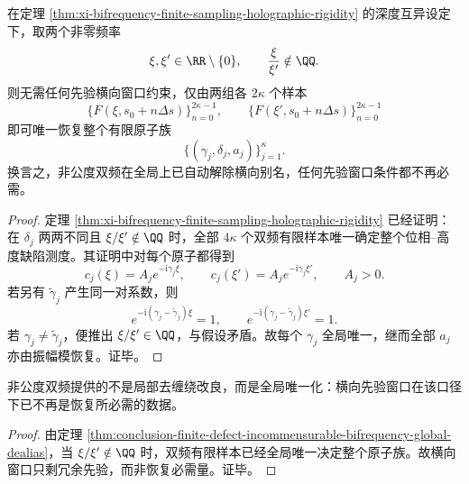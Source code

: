 \begin{theorem}[非公度双频的全局去缠绕]\label{thm:conclusion-finite-defect-incommensurable-bifrequency-global-dealias}
在定理 \ref{thm:xi-bifrequency-finite-sampling-holographic-rigidity} 的深度互异设定下，取两个非零频率
\[
\xi,\xi'\in\RR\setminus\{0\},
\qquad
\frac{\xi}{\xi'}\notin\QQ.
\]
则无需任何先验横向窗口约束，仅由两组各 \(2\kappa\) 个样本
\[
\{F(\xi,s_0+n\Delta s)\}_{n=0}^{2\kappa-1},
\qquad
\{F(\xi',s_0+n\Delta s)\}_{n=0}^{2\kappa-1}
\]
即可唯一恢复整个有限原子族
\[
\{(\gamma_j,\delta_j,a_j)\}_{j=1}^{\kappa}.
\]
换言之，非公度双频在全局上已自动解除横向别名，任何先验窗口条件都不再必需。
\end{theorem}
\begin{proof}
定理 \ref{thm:xi-bifrequency-finite-sampling-holographic-rigidity} 已经证明：在 \(\delta_j\) 两两不同且 \(\xi/\xi'\notin\QQ\) 时，全部 \(4\kappa\) 个双频有限样本唯一确定整个位相--高度缺陷测度。其证明中对每个原子都得到
\[
c_j(\xi)=A_j e^{-\mathrm{i}\gamma_j\xi},
\qquad
c_j(\xi')=A_j e^{-\mathrm{i}\gamma_j\xi'},
\qquad A_j>0.
\]
若另有 \(\widetilde\gamma_j\) 产生同一对系数，则
\[
e^{-\mathrm{i}(\gamma_j-\widetilde\gamma_j)\xi}=1,
\qquad
e^{-\mathrm{i}(\gamma_j-\widetilde\gamma_j)\xi'}=1.
\]
若 \(\gamma_j\neq \widetilde\gamma_j\)，便推出 \(\xi/\xi'\in\QQ\)，与假设矛盾。故每个 \(\gamma_j\) 全局唯一，继而全部 \(a_j\) 亦由振幅模恢复。证毕。
\end{proof}

\begin{corollary}[非公度双频的全局唯一化]\label{cor:conclusion-finite-defect-incommensurable-bifrequency-global-uniqueness}
非公度双频提供的不是局部去缠绕改良，而是全局唯一化：横向先验窗口在该口径下已不再是恢复所必需的数据。
\end{corollary}
\begin{proof}
由定理 \ref{thm:conclusion-finite-defect-incommensurable-bifrequency-global-dealias}，当 \(\xi/\xi'\notin\QQ\) 时，双频有限样本已经全局唯一决定整个原子族。故横向窗口只剩冗余先验，而非恢复必需量。证毕。
\end{proof}

